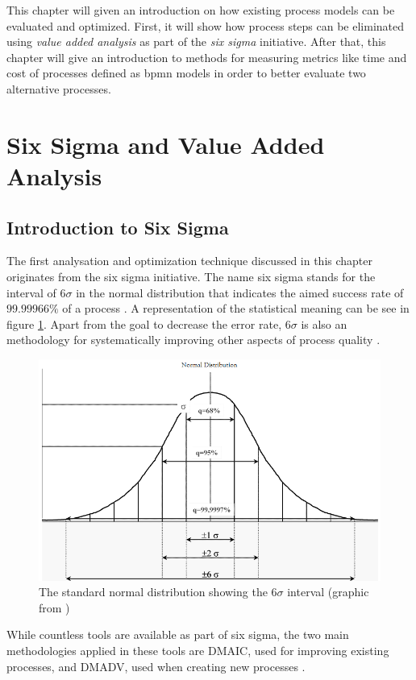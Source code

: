 \label{chapter-3}

This chapter will given an introduction on how existing process models can be evaluated and optimized. First, it will show how process steps can be eliminated using \textit{value added analysis} as part of the \textit{six sigma} initiative. After that, this chapter will give an introduction to methods for measuring metrics like time and cost of processes defined as \gls{bpmn} models in order to better evaluate two alternative processes.
\section{Six Sigma and Value Added Analysis}
\subsection{Introduction to Six Sigma}
The first analysation and optimization technique discussed in this chapter originates from the six sigma initiative. The name six sigma stands for the interval of $6\sigma$ in the normal distribution that indicates the aimed success rate of $99.99966\%$ of a process \cite{siha2008business}\cite{vivekananthamoorthy2011lean}. A representation of the statistical meaning can be see in figure \ref{fig:six-sigma}. Apart from the goal to decrease the error rate, $6\sigma$ is also an methodology for systematically improving other aspects of process quality \cite{tennant2017six}.

\begin{figure}[H]
		\centering
		\includegraphics[width=0.7\columnwidth]{graphics/six-sigma}
		\caption{The standard normal distribution showing the $6\sigma$ interval (graphic from \cite{vivekananthamoorthy2011lean})} 
		\label{fig:six-sigma} 
\end{figure}

While countless tools are available as part of six sigma, the two main methodologies applied in these tools are \gls{DMAIC}, used for improving existing processes, and \gls{DMADV}, used when creating new processes \cite{selvi2014six}.

